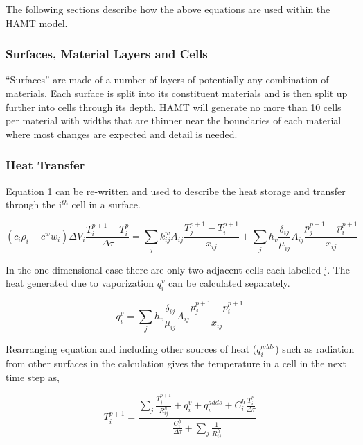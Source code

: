 The following sections describe how the above equations are used within the HAMT model.

\subsubsection{Surfaces, Material Layers and Cells}\label{surfaces-material-layers-and-cells}

``Surfaces'' are made of a number of layers of potentially any combination of materials. Each surface is split into its constituent materials and is then split up further into cells through its depth. HAMT will generate no more than 10 cells per material with widths that are thinner near the boundaries of each material where most changes are expected and detail is needed.

\subsubsection{Heat Transfer}\label{heat-transfer}

Equation 1 can be re-written and used to describe the heat storage and transfer through the i\(^{th}\) cell in a surface.

\begin{equation}
\left( {{c_i}{\rho_i} + {c^w}{w_i}} \right)\Delta {V_i}\frac{{T_i^{p + 1} - T_i^p}}{{\Delta \tau }} = \sum\limits_j {k_{ij}^w{A_{ij}}\frac{{T_j^{p + 1} - T_i^{p + 1}}}{{{x_{ij}}}}}  + \sum\limits_j {{h_v}\frac{{{\delta_{ij}}}}{{{\mu_{ij}}}}{A_{ij}}\frac{{p_j^{p + 1} - p_i^{p + 1}}}{{{x_{ij}}}}}
\end{equation}

In the one dimensional case there are only two adjacent cells each labelled j. The heat generated due to vaporization \(q_i^v\) can be calculated separately.

\begin{equation}
q_i^v = \sum\limits_j {{h_v}\frac{{{\delta_{ij}}}}{{{\mu_{ij}}}}{A_{ij}}\frac{{p_j^{p + 1} - p_i^{p + 1}}}{{{x_{ij}}}}}
\end{equation}

Rearranging equation and including other sources of heat (\(q_i^{adds}\)) such as radiation from other surfaces in the calculation gives the temperature in a cell in the next time step as,

\begin{equation}
T_i^{p + 1} = \frac{{\sum\nolimits_j {\frac{{T_j^{p + 1}}}{{R_{ij}^h}}}  + q_i^v + q_i^{adds} + C_i^h\frac{{T_i^p}}{{\Delta \tau }}}}{{\frac{{C_i^h}}{{\Delta \tau }} + \sum\nolimits_j {\frac{1}{{R_{ij}^h}}} }}
\end{equation}

